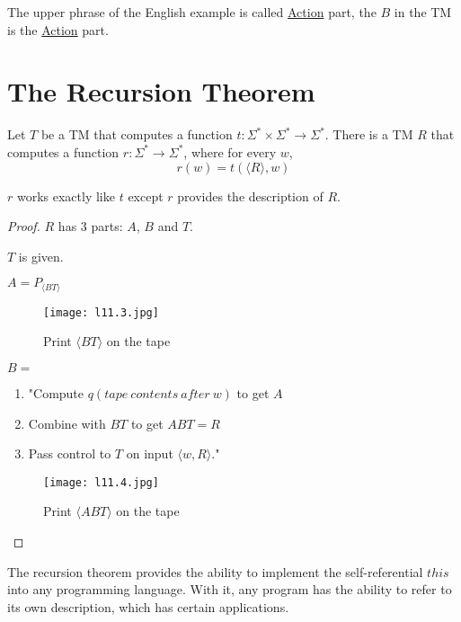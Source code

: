 The upper phrase of the English example is called \underline{Action} part, the \(B\) in the TM is the \underline{Action} part. 

\section{The Recursion Theorem}

\begin{theorem}
    Let \(T\) be a TM that computes a function \(t: \Sigma^* \times \Sigma^* \rightarrow \Sigma^*\). 
    There is a TM \(R\) that computes a function \(r:\Sigma^* \rightarrow \Sigma^*\), where for every \(w\),
    \[
        r(w) = t(\langle R \rangle, w)
    \]   
    \begin{remark}
        \(r\) works exactly like \(t\) except \(r\) provides the description of \(R\).    
    \end{remark}
\end{theorem}
\begin{proof}
    \(R\) has 3 parts: \(A\), \(B\) and \(T\).

    \(T\) is given. 

    \(A = P_{\langle BT \rangle}\) 

    \begin{figure}[H]
        \centering
        \texttt{[image: l11.3.jpg]}
        \caption{Print \(\langle BT \rangle\) on the tape}
    \end{figure}

    \(B = \) \begin{enumerate}
        \item "Compute \(q(tape \: contents \: after\: w)\) to get \(A\)
        \item Combine with \(BT\) to get \(ABT = R\)
        \item Pass control to \(T\) on input \(\langle w, R \rangle\)."      
    \end{enumerate} 

    \begin{figure}[H]
        \centering
        \texttt{[image: l11.4.jpg]}
        \caption{Print \(\langle ABT \rangle\) on the tape}
    \end{figure}
\end{proof}

\begin{note}
    The recursion theorem provides the ability to implement the self-referential \(this\) into any programming language. 
    With it, any program has the ability to refer to its own description, which has certain applications.
\end{note}

